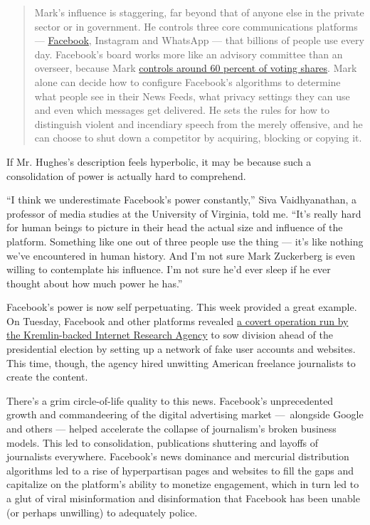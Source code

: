 \begin{quote}
Mark's influence is staggering, far beyond that of anyone else in the
private sector or in government. He controls three core communications
platforms ---
\href{https://www.nytimes3xbfgragh.onion/2019/05/09/business/facebook-response-chris-hughes.html}{Facebook},
Instagram and WhatsApp --- that billions of people use every day.
Facebook's board works more like an advisory committee than an overseer,
because Mark
\href{https://www.vox.com/technology/2018/11/19/18099011/mark-zuckerberg-facebook-stock-nyt-wsj}{controls
around 60 percent of voting shares}. Mark alone can decide how to
configure Facebook's algorithms to determine what people see in their
News Feeds, what privacy settings they can use and even which messages
get delivered. He sets the rules for how to distinguish violent and
incendiary speech from the merely offensive, and he can choose to shut
down a competitor by acquiring, blocking or copying it.
\end{quote}

If Mr. Hughes's description feels hyperbolic, it may be because such a
consolidation of power is actually hard to comprehend.

``I think we underestimate Facebook's power constantly,'' Siva
Vaidhyanathan, a professor of media studies at the University of
Virginia, told me. ``It's really hard for human beings to picture in
their head the actual size and influence of the platform. Something like
one out of three people use the thing --- it's like nothing we've
encountered in human history. And I'm not sure Mark Zuckerberg is even
willing to contemplate his influence. I'm not sure he'd ever sleep if he
ever thought about how much power he has.''

Facebook's power is now self perpetuating. This week provided a great
example. On Tuesday, Facebook and other platforms revealed
\href{https://www.nytimes3xbfgragh.onion/2020/09/01/technology/facebook-russia-disinformation-election.html}{a
covert operation run by the Kremlin-backed Internet Research Agency} to
sow division ahead of the presidential election by setting up a network
of fake user accounts and websites. This time, though, the agency hired
unwitting American freelance journalists to create the content.

There's a grim circle-of-life quality to this news. Facebook's
unprecedented growth and commandeering of the digital advertising market
---~alongside Google and others --- helped accelerate the collapse of
journalism's broken business models. This led to consolidation,
publications shuttering and layoffs of journalists everywhere.
Facebook's news dominance and mercurial distribution algorithms led to a
rise of hyperpartisan pages and websites to fill the gaps and capitalize
on the platform's ability to monetize engagement, which in turn led to a
glut of viral misinformation and disinformation that Facebook has been
unable (or perhaps unwilling) to adequately police.

